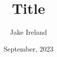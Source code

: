\documentclass[
	handout, %
	startingpause,
]{teamer}
\title{Title}
\date{September, 2023}
\author{Jake Ireland}
\begin{document}
\titleframe{}

\end{document}
